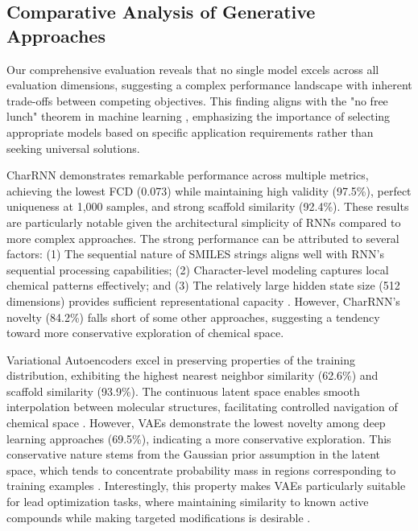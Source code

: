 \documentclass[conference]{IEEEtran}
\begin{document}
\subsection{Comparative Analysis of Generative Approaches}
Our comprehensive evaluation reveals that no single model excels across all evaluation dimensions, suggesting a complex performance landscape with inherent trade-offs between competing objectives. This finding aligns with the "no free lunch" theorem in machine learning \cite{Wolpert1997}, emphasizing the importance of selecting appropriate models based on specific application requirements rather than seeking universal solutions.

CharRNN demonstrates remarkable performance across multiple metrics, achieving the lowest FCD (0.073) while maintaining high validity (97.5\%), perfect uniqueness at 1,000 samples, and strong scaffold similarity (92.4\%). These results are particularly notable given the architectural simplicity of RNNs compared to more complex approaches. The strong performance can be attributed to several factors: (1) The sequential nature of SMILES strings aligns well with RNN's sequential processing capabilities; (2) Character-level modeling captures local chemical patterns effectively; and (3) The relatively large hidden state size (512 dimensions) provides sufficient representational capacity \cite{Segler2018, Arús-Pous2019}. However, CharRNN's novelty (84.2\%) falls short of some other approaches, suggesting a tendency toward more conservative exploration of chemical space.

Variational Autoencoders excel in preserving properties of the training distribution, exhibiting the highest nearest neighbor similarity (62.6\%) and scaffold similarity (93.9\%). The continuous latent space enables smooth interpolation between molecular structures, facilitating controlled navigation of chemical space \cite{Gomez-Bombarelli2018}. However, VAEs demonstrate the lowest novelty among deep learning approaches (69.5\%), indicating a more conservative exploration. This conservative nature stems from the Gaussian prior assumption in the latent space, which tends to concentrate probability mass in regions corresponding to training examples \cite{Winter2019}. Interestingly, this property makes VAEs particularly suitable for lead optimization tasks, where maintaining similarity to known active compounds while making targeted modifications is desirable \cite{Blaschke2018}.
\end{document}
